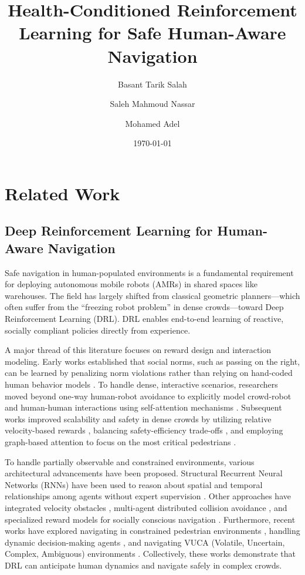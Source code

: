 \documentclass[11pt,a4paper]{article}
\title{\textbf{Health-Conditioned Reinforcement Learning for Safe Human-Aware Navigation}}
\author[1]{Basant Tarik Salah}
\author[1]{Saleh Mahmoud Nassar}
\author[2]{Mohamed Adel}
\affil{Department of Mechatronics and Robotics Engineering, Egypt-Japan University of Science and Technology (E-JUST), Alexandria, Egypt}
\date{\today}
\begin{document}
\maketitle

\section{Related Work}
\label{sec:related_work}

\subsection{Deep Reinforcement Learning for Human-Aware Navigation}
Safe navigation in human-populated environments is a fundamental requirement for deploying autonomous mobile robots (AMRs) in shared spaces like warehouses. The field has largely shifted from classical geometric planners---which often suffer from the ``freezing robot problem'' in dense crowds---toward Deep Reinforcement Learning (DRL). DRL enables end-to-end learning of reactive, socially compliant policies directly from experience. 

A major thread of this literature focuses on reward design and interaction modeling. Early works established that social norms, such as passing on the right, can be learned by penalizing norm violations rather than relying on hand-coded human behavior models \cite{chen2017socially}. To handle dense, interactive scenarios, researchers moved beyond one-way human-robot avoidance to explicitly model crowd-robot and human-human interactions using self-attention mechanisms \cite{chen2018crowd}. Subsequent works improved scalability and safety in dense crowds by utilizing relative velocity-based rewards \cite{xie2023drlvo}, balancing safety-efficiency trade-offs \cite{l2b2023}, and employing graph-based attention to focus on the most critical pedestrians \cite{chen2019robot}. 

To handle partially observable and constrained environments, various architectural advancements have been proposed. Structural Recurrent Neural Networks (RNNs) have been used to reason about spatial and temporal relationships among agents without expert supervision \cite{liu2020decentralized}. Other approaches have integrated velocity obstacles \cite{xie2023drlvo}, multi-agent distributed collision avoidance \cite{chen2016decentralized}, and specialized reward models for socially conscious navigation \cite{socially_conscious_nav}. Furthermore, recent works have explored navigating in constrained pedestrian environments \cite{perez2020robot}, handling dynamic decision-making agents \cite{everett2021motion}, and navigating VUCA (Volatile, Uncertain, Complex, Ambiguous) environments \cite{vuca_nav}. Collectively, these works demonstrate that DRL can anticipate human dynamics and navigate safely in complex crowds.
\end{document}
